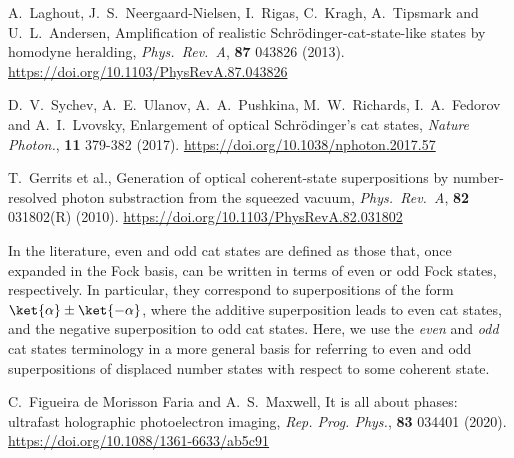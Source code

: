 \begin{thebibliography}{}
    A.\ Laghout, J.\ S.\ Neergaard-Nielsen, I.\ Rigas, C.\ Kragh, A.\ Tipsmark and U.\ L.\ Andersen, Amplification of realistic Schrödinger-cat-state-like states by homodyne heralding, \emph{Phys.\ Rev.\ A}, \textbf{87} 043826 (2013). \url{https://doi.org/10.1103/PhysRevA.87.043826}

    D.\ V.\ Sychev, A.\ E.\ Ulanov, A.\ A.\ Pushkina, M.\ W.\ Richards, I.\ A.\ Fedorov and A.\ I.\ Lvovsky, Enlargement of optical Schrödinger's cat states, \emph{Nature Photon.}, \textbf{11} 379-382 (2017). \url{https://doi.org/10.1038/nphoton.2017.57}

    T.\ Gerrits et al., Generation of optical coherent-state superpositions by number-resolved photon substraction from the squeezed vacuum, \emph{Phys.\ Rev.\ A}, \textbf{82} 031802(R) (2010). \url{https://doi.org/10.1103/PhysRevA.82.031802}
    
    In the literature, even and odd cat states are defined as those that, once expanded in the Fock basis, can be written in terms of even or odd Fock states, respectively. In particular, they correspond to superpositions of the form $\ket{\alpha} \pm \ket{-\alpha}$, where the additive superposition leads to even cat states, and the negative superposition to odd cat states. Here, we use the \emph{even} and \emph{odd} cat states terminology in a more general basis for referring to even and odd superpositions of displaced number states with respect to some coherent state.
    
    C.\ Figueira de Morisson Faria and A.\ S.\ Maxwell, It is all about phases: ultrafast holographic photoelectron imaging, \emph{Rep. Prog. Phys.}, \textbf{83} 034401 (2020). \url{https://doi.org/10.1088/1361-6633/ab5c91} 
\end{thebibliography}

\appendix
